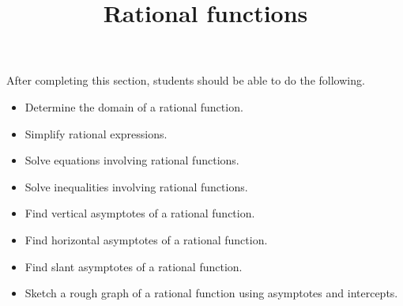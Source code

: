 \documentclass{ximera}
\title{Rational functions}
\begin{document}
\begin{abstract} 
\end{abstract}

\maketitle

\begin{sectionOutcomes}
After completing this section, students should be able to do the following.

\begin{itemize}
	\item Determine the domain of a rational function.
	\item Simplify rational expressions.
	\item Solve equations involving rational functions.
        \item Solve inequalities involving rational functions.
	\item Find vertical asymptotes of a rational function.
	\item Find horizontal asymptotes of a rational function.
	\item Find slant asymptotes of a rational function.
	\item Sketch a rough graph of a rational function using asymptotes and intercepts.
\end{itemize}
\end{sectionOutcomes}
\end{document}
